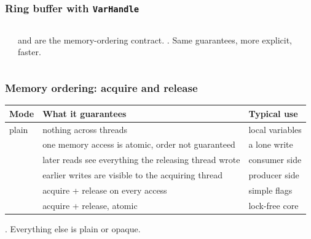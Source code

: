 \documentclass[aspectratio=169,10pt,compress]{beamer}
\begin{document}
\begin{frame}[t,fragile] \frametitle{Ring buffer with \texttt{VarHandle}}
  \begin{columns}[T]
    \begin{column}{0.56\textwidth}
    \end{column}
    \begin{column}{0.4\textwidth}
      \small
       and  are the memory-ordering
      contract. . Same
      guarantees, more explicit, faster.
    \end{column}
  \end{columns}
\end{frame}




\begin{frame}[t,fragile] \frametitle{Memory ordering: acquire and release}
  \begin{center}\small
  \begin{tabular}{L{0.22\textwidth}L{0.5\textwidth}L{0.2\textwidth}}
    \toprule
    \textbf{Mode} & \textbf{What it guarantees} & \textbf{Typical use} \\
    \midrule
    plain      & nothing across threads                              & local variables \\
        & one memory access is atomic, order not guaranteed     & a lone write \\
       & later reads see everything the releasing thread wrote & consumer side \\
       & earlier writes are visible to the acquiring thread    & producer side \\
      & acquire + release on every access                     & simple flags \\
     & acquire + release, atomic                      & lock-free core \\
    \bottomrule
  \end{tabular}
  \end{center}
  \vspace{0.3em}
  \small
  . Everything else is plain or opaque.
\end{frame}
\end{document}
